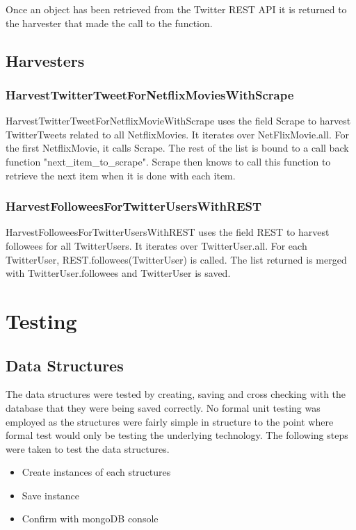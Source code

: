 Once an object has been retrieved from the Twitter REST API it is returned to the harvester that made the call to the function.

\subsection{Harvesters}
\subsubsection{HarvestTwitterTweetForNetflixMoviesWithScrape}
HarvestTwitterTweetForNetflixMovieWithScrape uses the field Scrape to harvest TwitterTweets related to all NetflixMovies. It iterates over NetFlixMovie.all. For the first NetflixMovie, it calls Scrape. The rest of the list is bound to a call back function "next\_item\_to\_scrape". Scrape then knows to call this function to retrieve the next item when it is done with each item.

\subsubsection{HarvestFolloweesForTwitterUsersWithREST}
HarvestFolloweesForTwitterUsersWithREST uses the field REST to harvest followees for all TwitterUsers. It iterates over TwitterUser.all. For each TwitterUser, REST.followees(TwitterUser) is called. The list returned is merged with TwitterUser.followees and TwitterUser is saved.


\section{Testing}\label{impl:Testing}
\subsection{Data Structures}
The data structures were tested by creating, saving and cross checking with the database that they were being saved correctly. No formal unit testing was employed as the structures were fairly simple in structure to the point where formal test would only be testing the underlying technology. The following steps were taken to test the data structures.

	\begin{itemize}
	\item Create instances of each structures
	\item Save instance
	\item Confirm with mongoDB console
	\end{itemize}

